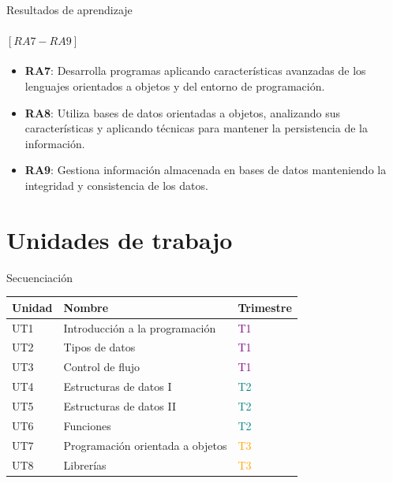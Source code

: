 \documentclass{beamer}
\begin{document}
\begin{frame}{Resultados de aprendizaje}
    \framesubtitle{$[RA7-RA9]$}
    \begin{itemize}
        \item \textbf{RA7}: Desarrolla programas aplicando características avanzadas de los lenguajes orientados a objetos y del entorno de programación.
        \item \textbf{RA8}: Utiliza bases de datos orientadas a objetos, analizando sus características y aplicando técnicas para mantener la persistencia de la información.
        \item \textbf{RA9}: Gestiona información almacenada en bases de datos manteniendo la integridad y consistencia de los datos.
    \end{itemize}
\end{frame}

\section{Unidades de trabajo}

\begin{frame}{Secuenciación}
    \begin{tabular}{|l|l|l|}
        \hline
        \textbf{Unidad} & \textbf{Nombre} & \textbf{Trimestre}\\
        \hline
        UT1 & Introducción a la programación & \textcolor{purple}{T1}\\
        \hline
        UT2 & Tipos de datos & \textcolor{purple}{T1}\\
        \hline
        UT3 & Control de flujo & \textcolor{purple}{T1}\\
        \hline
        \hline
        UT4 & Estructuras de datos I & \textcolor{teal}{T2}\\
        \hline
        UT5 & Estructuras de datos II & \textcolor{teal}{T2}\\
        \hline
        UT6 & Funciones & \textcolor{teal}{T2}\\
        \hline
        \hline
        UT7 & Programación orientada a objetos & \textcolor{orange}{T3}\\
        \hline
        UT8 & Librerías & \textcolor{orange}{T3}\\
        \hline
    \end{tabular}
\end{frame}
\end{document}
